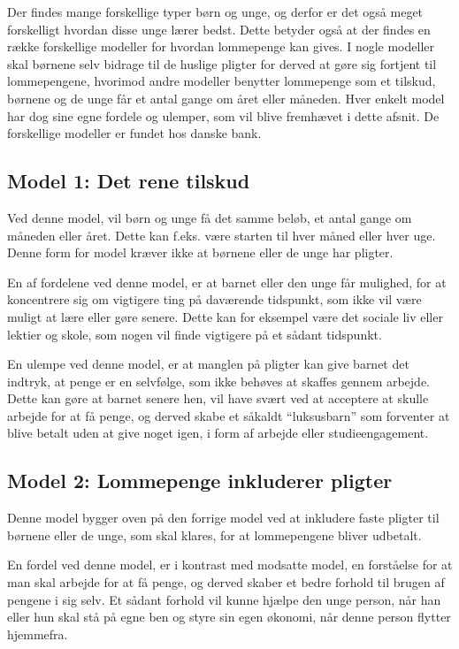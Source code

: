 Der findes mange forskellige typer børn og unge, 
og derfor er det også meget forskelligt hvordan 
disse unge lærer bedst. Dette betyder også at 
der findes en række forskellige modeller for 
hvordan lommepenge kan gives. I nogle modeller 
skal børnene selv bidrage til de huslige pligter 
for derved at gøre sig fortjent til 
lommepengene, hvorimod andre modeller benytter 
lommepenge som et tilskud, børnene og de unge 
får et antal gange om året eller måneden. Hver 
enkelt model har dog sine egne fordele og 
ulemper, som vil blive fremhævet i dette afsnit. 
De forskellige modeller er fundet hos danske 
bank\cite{DanskeB2}\cite{DanskeB3}.

\subsection{Model 1: Det rene tilskud}
Ved denne model, vil børn og unge få det samme 
beløb, et antal gange om måneden eller året. 
Dette kan f.eks. være starten til hver måned 
eller hver uge. Denne form for model kræver ikke 
at børnene eller de unge har pligter.

En af fordelene ved denne model, er at barnet 
eller den unge får mulighed, for at koncentrere 
sig om vigtigere ting på daværende tidspunkt, 
som ikke vil være muligt at lære eller gøre 
senere. Dette kan for eksempel være det sociale 
liv eller lektier og skole, som nogen vil finde 
vigtigere på et sådant tidspunkt.

En ulempe ved denne model, er at manglen på 
pligter kan give barnet det indtryk, at penge er 
en selvfølge, som ikke behøves at skaffes gennem 
arbejde. Dette kan gøre at barnet senere hen, 
vil have svært ved at acceptere at skulle 
arbejde for at få penge, og derved skabe et 
såkaldt “luksusbarn” som forventer at blive 
betalt uden at give noget igen, i form af 
arbejde eller studieengagement.

\subsection{Model 2: Lommepenge inkluderer 
pligter}
Denne model bygger oven på den forrige model ved 
at inkludere faste pligter til børnene eller de 
unge, som skal klares, for at lommepengene 
bliver udbetalt.

En fordel ved denne model, er i kontrast med 
modsatte model, en forståelse for at man skal 
arbejde for at få penge, og derved skaber et 
bedre forhold til brugen af pengene i sig selv. 
Et sådant forhold vil kunne hjælpe den unge 
person, når han eller hun skal stå på egne ben 
og styre sin egen økonomi, når denne person 
flytter hjemmefra.

